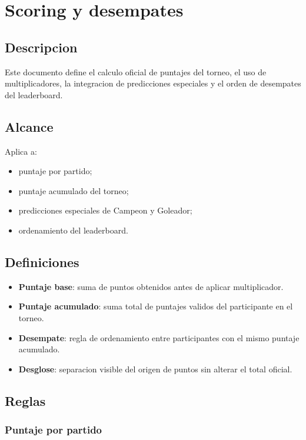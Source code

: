 \section{Scoring y desempates}

\subsection{Descripcion}

Este documento define el calculo oficial de puntajes del torneo, el uso de multiplicadores, la integracion de predicciones especiales y el orden de desempates del leaderboard.

\subsection{Alcance}

Aplica a:

\begin{itemize}
  \item puntaje por partido;
  \item puntaje acumulado del torneo;
  \item predicciones especiales de Campeon y Goleador;
  \item ordenamiento del leaderboard.
\end{itemize}

\subsection{Definiciones}

\begin{itemize}
  \item \textbf{Puntaje base}: suma de puntos obtenidos antes de aplicar multiplicador.
  \item \textbf{Puntaje acumulado}: suma total de puntajes validos del participante en el torneo.
  \item \textbf{Desempate}: regla de ordenamiento entre participantes con el mismo puntaje acumulado.
  \item \textbf{Desglose}: separacion visible del origen de puntos sin alterar el total oficial.
\end{itemize}

\subsection{Reglas}

\subsubsection{Puntaje por partido}

